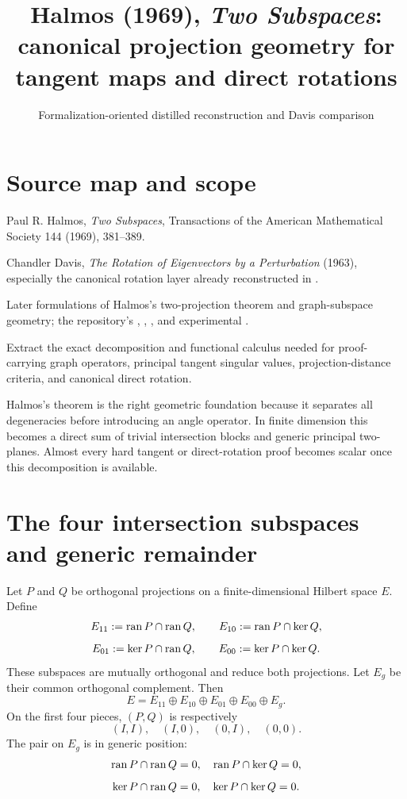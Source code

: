 
\title{Halmos (1969), \emph{Two Subspaces}:\\canonical projection geometry for tangent maps and direct rotations}
\author{}
\date{Formalization-oriented distilled reconstruction and Davis comparison}

\maketitle

\section*{Source map and scope}
\begin{sourceguide}
\item[Primary source] Paul R. Halmos, \emph{Two Subspaces}, Transactions of the American Mathematical Society 144 (1969), 381--389.
\item[Companion source] Chandler Davis, \emph{The Rotation of Eigenvectors by a Perturbation} (1963), especially the canonical rotation layer already reconstructed in .
\item[Modern checks] Later formulations of Halmos's two-projection theorem and graph-subspace geometry; the repository's , , , and experimental .
\item[Purpose] Extract the exact decomposition and functional calculus needed for proof-carrying graph operators, principal tangent singular values, projection-distance criteria, and canonical direct rotation.
\end{sourceguide}

Halmos's theorem is the right geometric foundation because it separates all degeneracies before introducing an angle operator. In finite dimension this becomes a direct sum of trivial intersection blocks and generic principal two-planes. Almost every hard tangent or direct-rotation proof becomes scalar once this decomposition is available.

\section{The four intersection subspaces and generic remainder}

Let $P$ and $Q$ be orthogonal projections on a finite-dimensional Hilbert space $E$. Define
\[
  E_{11}:=\operatorname{ran} P\cap\operatorname{ran} Q,
  \qquad
  E_{10}:=\operatorname{ran} P\cap\ker Q,
\]
\[
  E_{01}:=\ker P\cap\operatorname{ran} Q,
  \qquad
  E_{00}:=\ker P\cap\ker Q.
\]
These subspaces are mutually orthogonal and reduce both projections. Let $E_g$ be their common orthogonal complement. Then
\[
  E=E_{11}\oplus E_{10}\oplus E_{01}\oplus E_{00}\oplus E_g.
\]
On the first four pieces, $(P,Q)$ is respectively
\[
  (I,I),\quad(I,0),\quad(0,I),\quad(0,0).
\]
The pair on $E_g$ is in generic position:
\[
  \operatorname{ran} P\cap\operatorname{ran} Q=0,
  \quad
  \operatorname{ran} P\cap\ker Q=0,
\]
\[
  \ker P\cap\operatorname{ran} Q=0,
  \quad
  \ker P\cap\ker Q=0.
\]


